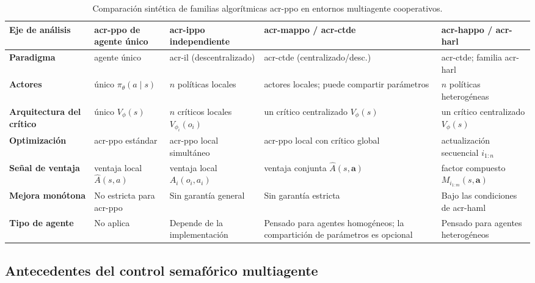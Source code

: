 \begin{table}[H]
\centering
\caption{Comparación sintética de familias algorítmicas \acrshort{acr-ppo} en entornos multiagente cooperativos.}
\label{tab:marl_ppo_comparison}
\setlength{\tabcolsep}{4pt}
\small
\begin{tabular}{|>{\raggedright\arraybackslash}p{2.6cm}|>{\raggedright\arraybackslash}p{2.8cm}|>{\raggedright\arraybackslash}p{3.1cm}|>{\raggedright\arraybackslash}p{3.2cm}|>{\raggedright\arraybackslash}p{2.8cm}|}
\hline
\textbf{Eje de análisis} & \textbf{\acrshort{acr-ppo} de agente único} & \textbf{\acrshort{acr-ippo} independiente} & \textbf{\acrshort{acr-mappo} / \acrshort{acr-ctde}} & \textbf{\acrshort{acr-happo} / \acrshort{acr-harl}} \\ \hline
 \textbf{Paradigma} & agente único & \acrshort{acr-il} (descentralizado) & \acrshort{acr-ctde} (centralizado/desc.) & \acrshort{acr-ctde}; familia \acrshort{acr-harl} \\ \hline
 \textbf{Actores} & único $\pi_\theta(a \mid s)$ & $n$ políticas locales & actores locales; puede compartir parámetros & $n$ políticas heterogéneas \\ \hline
 \textbf{Arquitectura del crítico} & único $V_\phi(s)$ & $n$ críticos locales $V_{\phi_i}(o_i)$ & un crítico centralizado $V_\phi(s)$ & un crítico centralizado $V_\phi(s)$ \\ \hline
 \textbf{Optimización} & \acrshort{acr-ppo} estándar & \acrshort{acr-ppo} local simultáneo & \acrshort{acr-ppo} local con crítico global & actualización secuencial $i_{1:n}$ \\ \hline
 \textbf{Señal de ventaja} & ventaja local $\hat{A}(s, a)$ & ventaja local $\hat{A}_i(o_i, a_i)$ & ventaja conjunta $\hat{A}(s, \mathbf{a})$ & factor compuesto $M_{i_{1:m}}(s, \mathbf{a})$ \\ \hline
\textbf{Mejora monótona} & No estricta para \acrshort{acr-ppo} & Sin garantía general & Sin garantía estricta & Bajo las condiciones de \acrshort{acr-haml} \\ \hline
\textbf{Tipo de agente} & No aplica & Depende de la implementación & Pensado para agentes homogéneos; la compartición de parámetros es opcional & Pensado para agentes heterogéneos \\ \hline
\end{tabular}
\end{table}

\subsection{Antecedentes del control semafórico multiagente}\label{subsec:antecedentes_marl_tsc}

